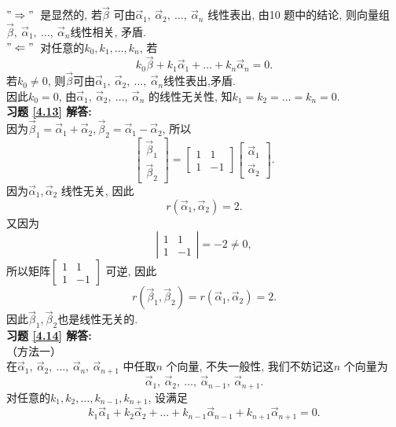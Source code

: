 $"\Rightarrow"$\  是显然的, 若$\vec{\beta}$ 可由$\vec{\alpha}_1, \ \vec{\alpha}_2, \ \dots,\ \vec{\alpha}_n$ 线性表出, 由10 题中的结论,
则向量组$\vec{\beta},\ \vec{\alpha}_1, \ \dots,\ \vec{\alpha}_n$线性相关, 矛盾.\\
$"\Leftarrow"$\ 对任意的$k_0,k_1,\dots,k_n$, 若
$$k_0\vec{\beta}+k_1\vec{\alpha}_1+\dots+k_n\vec{\alpha}_n=0.$$
若$k_0\not=0$, 则$\vec{\beta}$可由$\vec{\alpha}_1, \ \vec{\alpha}_2, \ \dots,\ \vec{\alpha}_n$线性表出,矛盾. \\
因此$k_0=0$, 由$\vec{\alpha}_1, \ \vec{\alpha}_2, \ \dots,\ \vec{\alpha}_n$ 的线性无关性, 知$k_1=k_2=\dots=k_n=0$.\\
\textbf{习题 \ref{4.13} 解答:}\\
因为$\vec{\beta}_1=\vec{\alpha}_1+\vec{\alpha}_2, \vec{\beta}_2=\vec{\alpha}_1-\vec{\alpha}_2$,
所以\begin{displaymath}\begin{bmatrix}\vec{\beta}_1\\ \vec{\beta}_2\end{bmatrix}=
\begin{bmatrix}1&1\\1&-1\end{bmatrix}\begin{bmatrix}\vec{\alpha}_1\\ \vec{\alpha}_2\end{bmatrix}.\end{displaymath}
因为$\vec{\alpha}_1,\vec{\alpha}_2$ 线性无关, 因此$$r(\vec{\alpha}_1,\vec{\alpha}_2)=2.$$
又因为$$\left|\begin{array}{cc}1&1\\1&-1\end{array}\right|=-2\not=0,$$
所以矩阵$\begin{bmatrix}1&1\\1&-1\end{bmatrix}$ 可逆, 因此$$r(\vec{\beta}_1,\vec{\beta}_2)=r(\vec{\alpha}_1,\vec{\alpha}_2)=2.$$
因此$\vec{\beta}_1,\vec{\beta}_2$也是线性无关的.\\
\textbf{习题 \ref{4.14} 解答:}\\
（方法一）\\
在$\vec{\alpha}_1, \ \vec{\alpha}_2, \ \dots,\ \vec{\alpha}_n,\ \vec{\alpha}_{n+1}$ 中任取$n$ 个向量, 不失一般性, 我们不妨记这$n$ 个向量为$$\vec{\alpha}_1, \ \vec{\alpha}_2, \ \dots,\ \vec{\alpha}_{n-1},\ \vec{\alpha}_{n+1}.$$
对任意的$k_1,k_2,\dots,k_{n-1},k_{n+1}$, 设满足
$$k_1\vec{\alpha}_1+k_2\vec{\alpha}_2+\dots+k_{n-1}\vec{\alpha}_{n-1}+k_{n+1}\vec{\alpha}_{n+1}=0.$$
